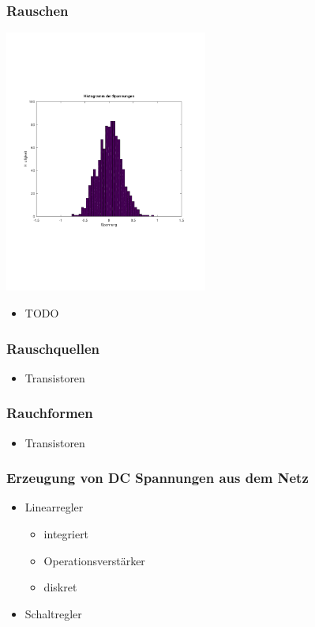 \documentclass[aspectratio=32]{beamer}
\begin{document}
\begin{frame}
  \frametitle{Rauschen}
  \centering
  \includegraphics[width=0.5\textwidth]{../common/Simulation/rauschen/haeufigkeit.pdf}
  \begin{itemize}
    \item TODO
  \end{itemize}
\end{frame}

\begin{frame}
  \frametitle{Rauschquellen}
  \centering
  \begin{itemize}
    \item Transistoren 
  \end{itemize}
\end{frame}

\begin{frame}
  \frametitle{Rauchformen}
  \centering
  \begin{itemize}
    \item Transistoren 
  \end{itemize}
\end{frame}

\begin{frame}
  \frametitle{Erzeugung von DC Spannungen aus dem Netz}
  \centering
  \begin{itemize}
    \item Linearregler 
    \begin{itemize}
      \item integriert
      \item Operationsverstärker
      \item diskret
    \end{itemize}
    \item Schaltregler
  \end{itemize}
\end{frame}
\end{document}
